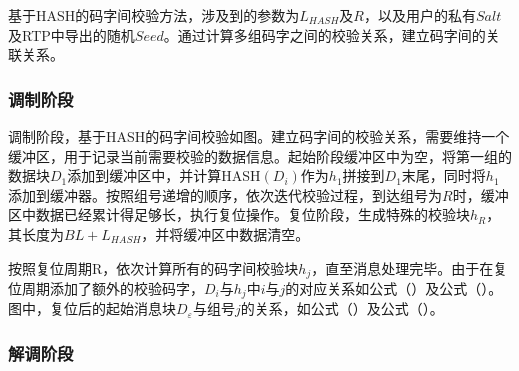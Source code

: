 基于HASH的码字间校验方法，涉及到的参数为$L_{HASH}$及$R$，以及用户的私有$Salt$及RTP中导出的随机$Seed$。通过计算多组码字之间的校验关系，建立码字间的关联关系。

\subsubsection{调制阶段}
\label{chap:hash:robustness:hash:modulation}

调制阶段，基于HASH的码字间校验如图。建立码字间的校验关系，需要维持一个缓冲区，用于记录当前需要校验的数据信息。起始阶段缓冲区中为空，将第一组的数据块$D_{1}$添加到缓冲区中，并计算HASH$(D_{i})$作为$h_{1}$拼接到$D_{1}$末尾，同时将$h_{1}$添加到缓冲器。按照组号递增的顺序，依次迭代校验过程，到达组号为$R$时，缓冲区中数据已经累计得足够长，执行复位操作。复位阶段，生成特殊的校验块$h_{R}$，其长度为$BL+L_{HASH}$，并将缓冲区中数据清空。

按照复位周期R，依次计算所有的码字间校验块$h_{j}$，直至消息处理完毕。由于在复位周期添加了额外的校验码字，$D_{i}$与$h_{j}$中$i$与$j$的对应关系如公式（）及公式（）。图中，复位后的起始消息块$D_{\varepsilon}$与组号$j$的关系，如公式（）及公式（）。

\subsubsection{解调阶段}
\label{chap:hash:robustness:hash:demodulation}



